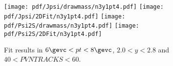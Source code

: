 \begin{figure}[H]
\begin{center}
\texttt{[image: pdf/Jpsi/drawmass/n3y1pt4.pdf]}
\texttt{[image: pdf/Jpsi/2DFit/n3y1pt4.pdf]}
\vspace*{-0.5cm}
\texttt{[image: pdf/Psi2S/drawmass/n3y1pt4.pdf]}
\texttt{[image: pdf/Psi2S/2DFit/n3y1pt4.pdf]}
\vspace*{-0.5cm}
\end{center}
\caption{Fit results in $6\gevc<pt<8\gevc$, $2.0<y<2.8$ and $40<PVNTRACKS<60$.}
\label{Fitn3y1pt4}
\end{figure}
